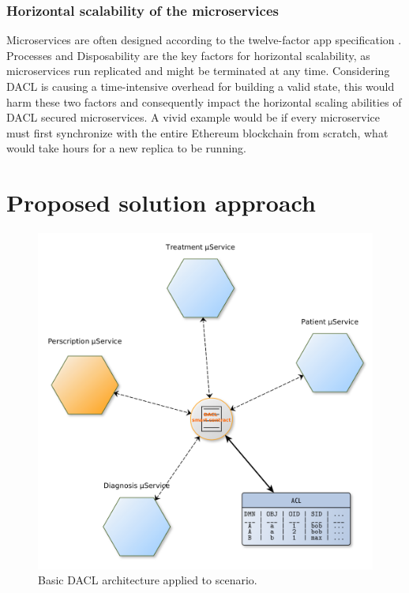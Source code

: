 \documentclass[12pt, conference]{IEEEtran}
\begin{document}
\subsubsection{Horizontal scalability of the microservices}

Microservices are often designed according to the twelve-factor app specification \cite{site1}. Processes and Disposability are the key factors for horizontal scalability, as microservices run replicated and might be terminated at any time. Considering DACL is causing a time-intensive overhead for building a valid state, this would harm these two factors and consequently impact the horizontal scaling abilities of DACL secured microservices. A vivid example would be if every microservice must first synchronize with the entire Ethereum blockchain from scratch, what would take hours for a new replica to be running.



\section{Proposed solution approach}


\begin{figure}[!h]
    \centering
  \includegraphics[width=\linewidth]{figures/DACL-basic.png}
  \caption{Basic DACL architecture applied to scenario.}
  \label{fig:basic-dacl}
\end{figure}
\end{document}
